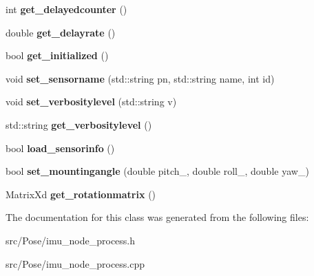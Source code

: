 \begin{DoxyCompactItemize}
int {\bfseries get\+\_\+delayedcounter} ()
\item 
\mbox{\label{classIMUNodeProcess_a7bfeb1c2c42333820f8e56b4e617b485}} 
double {\bfseries get\+\_\+delayrate} ()
\item 
\mbox{\label{classIMUNodeProcess_a90cb329fa7977bd9951580df8769df66}} 
bool {\bfseries get\+\_\+initialized} ()
\item 
\mbox{\label{classIMUNodeProcess_af008536581dbb3ebbe9fda87bee3ddcd}} 
void {\bfseries set\+\_\+sensorname} (std\+::string pn, std\+::string name, int id)
\item 
\mbox{\label{classIMUNodeProcess_a2621abe26bcb7d2788947c683c1bf94a}} 
void {\bfseries set\+\_\+verbositylevel} (std\+::string v)
\item 
\mbox{\label{classIMUNodeProcess_a489fa8ccabe3fe6262f1ff0857a512dd}} 
std\+::string {\bfseries get\+\_\+verbositylevel} ()
\item 
\mbox{\label{classIMUNodeProcess_a1a32d4e440179f9c2d0da9736a2af0f1}} 
bool {\bfseries load\+\_\+sensorinfo} ()
\item 
\mbox{\label{classIMUNodeProcess_a27952ac1db21ff8046b764b683afebc9}} 
bool {\bfseries set\+\_\+mountingangle} (double pitch\+\_\+, double roll\+\_\+, double yaw\+\_\+)
\item 
\mbox{\label{classIMUNodeProcess_aaa64dc2a9650cbdb2a0b1e56da8f2160}} 
Matrix\+Xd {\bfseries get\+\_\+rotationmatrix} ()
\end{DoxyCompactItemize}


The documentation for this class was generated from the following files\+:\begin{DoxyCompactItemize}
\item 
src/\+Pose/imu\+\_\+node\+\_\+process.\+h\item 
src/\+Pose/imu\+\_\+node\+\_\+process.\+cpp\end{DoxyCompactItemize}
